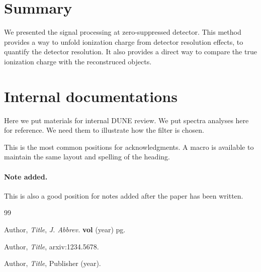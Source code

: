 \documentclass[a4paper,11pt]{article}
\begin{document}
\section{Summary}
We presented the signal processing at zero-suppressed detector. This method provides a way to unfold ionization charge from detector resolution effects, to quantify the detector resolution. It also provides a direct way to compare the true ionization charge with the reconstruced objects.

\appendix
\section{Internal documentations}
Here we put materials for internal DUNE review. We put spectra analyses here for reference. We need them to illustrate how the filter is chosen.





\acknowledgments

This is the most common positions for acknowledgments. A macro is
available to maintain the same layout and spelling of the heading.

\paragraph{Note added.} This is also a good position for notes added
after the paper has been written.





\begin{thebibliography}{99}

Author,
\emph{Title},
\emph{J. Abbrev.} {\bf vol} (year) pg.

Author,
\emph{Title},
arxiv:1234.5678.

Author,
\emph{Title},
Publisher (year).

\end{thebibliography}
\end{document}
